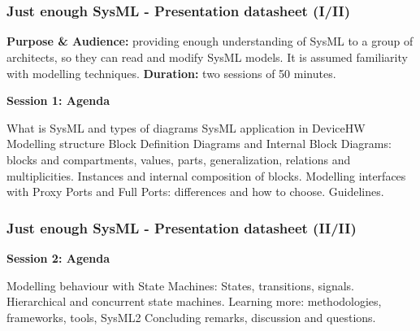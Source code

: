 \section{}
\begin{frame}
\frametitle {Just enough SysML - Presentation datasheet (I/II)}
\begin{block}{}
\textbf{Purpose \& Audience:} providing enough understanding of SysML to a group of architects, so they can read and modify SysML models. It is assumed familiarity with modelling techniques.\newline
\textbf{Duration:} two sessions of 50 minutes.
\end{block}

\textbf{Session 1: Agenda}
\begin{outline}
\1 What is SysML and types of diagrams
\1 SysML application in DeviceHW
\1 Modelling structure
\2 Block Definition Diagrams and Internal Block Diagrams: blocks and compartments, values, parts, generalization, relations and multiplicities. Instances and internal composition of blocks.
\2 Modelling interfaces with Proxy Ports and Full Ports: differences and how to choose. Guidelines.
\end{outline}
\end{frame}

\begin{frame}
\frametitle {Just enough SysML - Presentation datasheet (II/II)}
\textbf{Session 2: Agenda}
\begin{outline}
\1 Modelling behaviour with State Machines: States, transitions, signals. Hierarchical and concurrent state machines.
\1 Learning more: methodologies, frameworks, tools, SysML2
\1 Concluding remarks, discussion and questions.
\end{outline}
\end{frame}